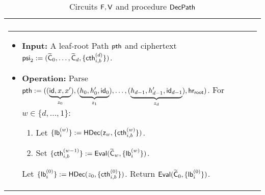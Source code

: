 \begin{table}[t!]
\begin{tabular}{| l |}
	\hline 			
	\begin{minipage}[t]{1.01\textwidth}
	\vspace{-5pt} 
	{\bf Procedure $\DecPath(\pth , \mathsf{psi}_2 )$:} \\
		\rule[6pt]{\textwidth}{1pt}
\begin{itemize}
    \item \textbf{Input:} A leaf-root Path $\mathsf{pth}$ and  ciphertext $\mathsf{psi}_2 :=  (\widetilde{\mathsf{C}}_0, \dots , \widetilde{\mathsf{C}}_{d} , \{\mathsf{cth}_{i,b}^{(d)} \})$.
    \item \textbf{Operation:} Parse $\mathsf{pth} :=  ((\underbrace{\mathsf{id} , x , x'}_{z_0}) , (\underbrace{h_0 , h'_0, \mathsf{id}_0}_{z_1}) ,    \dots , (\underbrace{h_{d-1} , h'_{d-1}, \mathsf{id}_{d-1}}_{z_{d}}) , \mathsf{hr_{root}})$. For $w \in \{d, \dots , 1\}$: %
    \begin{enumerate}
        \item Let $\{\mathsf{lb}_{i}^{(w)}\} := \mathsf{HDec}(\mathsf{z}_{w} , \{\mathsf{cth}_{i,b}^{(w)} \} ) $.
        \item Set $\{\mathsf{cth}_{i,b}^{(w-1)} \} := \mathsf{Eval}(\widetilde{\mathsf{C}}_{w} ,  \{\mathsf{lb}_{i}^{(w)} \})$.
    \end{enumerate}%
    
    
   Let $\{\mathsf{lb}_{i}^{(0)}\} := \mathsf{HDec}(z_0 , \{\mathsf{cth}_{i,b}^{(0)} \} ) $.  Return $\mathsf{Eval}(\widetilde{\mathsf{C}}_{0} ,  \{\mathsf{lb}_{i}^{(0)} \})$. 
    \end{itemize}
	\end{minipage}
	\end{tabular}
\vspace{3pt}
\caption{Circuits $\mathsf{F}, \mathsf{V}$ and procedure $\mathsf{DecPath}$}
\label{table:hybrids-SE-CPA}
\end{table}
  
  

